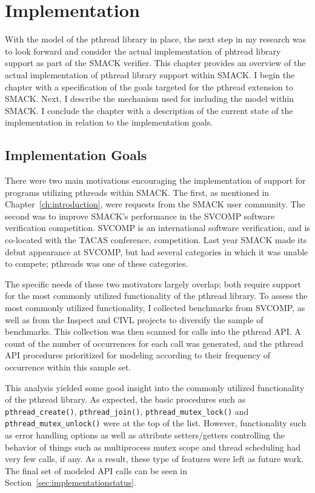 \chapter{Implementation}\label{ch:implementation}
With the model of the pthread library in place, the next step in my
research was to look forward and consider the actual implementation of
phtread library support as part of the SMACK verifier.  This chapter
provides an overview of the actual implementation of pthread library
support within SMACK.  I begin the chapter with a specification of the
goals targeted for the pthread extension to SMACK.  Next, I describe
the mechanism used for including the model within SMACK.  \iffalse
[This is followed by a discussion of changes required in the SMACK
tool itself to support the new model.]\fi  I conclude the chapter with
a description of the current state of the implementation in relation
to the implementation goals. 

\section{Implementation Goals}\label{sec:implementationgoals}
There were two main motivations encouraging the implementation of
support for programs utilizing pthreads within SMACK.  The first, as
mentioned in Chapter~\ref{ch:introduction}, were requests from the
SMACK user community.  The second was to improve SMACK's performance
in the SVCOMP software verification competition.  SVCOMP is an
international software verification, and is co-located with the TACAS
conference, competition.  Last year SMACK made its debut appearance at
SVCOMP, but had several categories in which it was unable to compete;
pthreads was one of these categories.

The specific needs of these two motivators largely overlap; both
require support for the most commonly utilized functionality of the
pthread library.  To assess the most commonly utilized functionality,
I collected benchmarks from SVCOMP, as well as from the Inspect and
CIVL projects to diversify the sample of benchmarks.  This collection
was then scanned for calls into the pthread API.  A count of the
number of occurrences for each call was generated, and the pthread API
procedures prioritized for modeling according to their frequency of
occurrence within this sample set. 

This analysis yielded some good insight into the commonly utilized
functionality of the pthread library.  As expected, the basic
procedures such as \lstinline[breaklines]|pthread_create()|,
\lstinline[breaklines]|pthread_join()|,
\lstinline[breaklines]|pthread_mutex_lock()| and 
\lstinline[breaklines]|pthread_mutex_unlock()| were at the top of the
list. However, functionality such as error handling options as well as
attribute setters/getters controlling the behavior of things such as
multiprocess mutex scope and thread scheduling had very few calls, if
any.  As a result, these type of features were left as future
work. The final set of modeled API calls can be seen in
Section~\ref{sec:implementationstatus}.  

